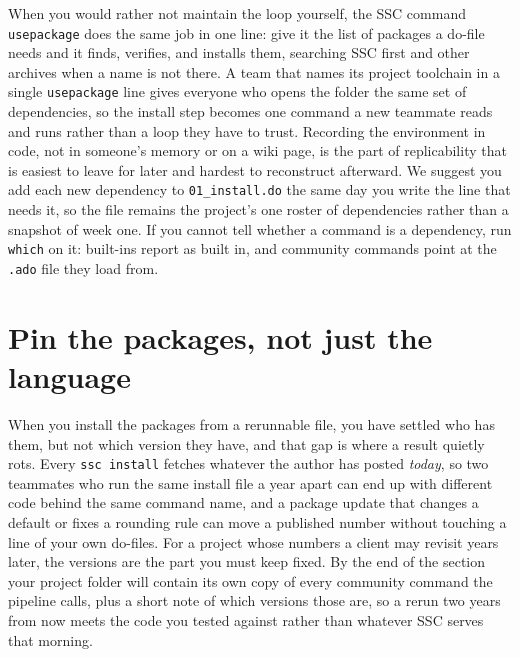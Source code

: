 When you would rather not maintain the loop yourself, the SSC command \texttt{usepackage} \parencite{booth2011usepackage} does the same job in one line: give it the list of packages a do-file needs and it finds, verifies, and installs them, searching SSC first and other archives when a name is not there. A team that names its project toolchain in a single \texttt{usepackage} line gives everyone who opens the folder the same set of dependencies, so the install step becomes one command a new teammate reads and runs rather than a loop they have to trust. Recording the environment in code, not in someone's memory or on a wiki page, is the part of replicability that is easiest to leave for later and hardest to reconstruct afterward. We suggest you add each new dependency to \texttt{01\_install.do} the same day you write the line that needs it, so the file remains the project's one roster of dependencies rather than a snapshot of week one. If you cannot tell whether a command is a dependency, run \texttt{which} on it: built-ins report as built in, and community commands point at the \texttt{.ado} file they load from.

\section{Pin the packages, not just the language}\label{sec:ch02-pinning}
When you install the packages from a rerunnable file, you have settled who has them, but not which version they have, and that gap is where a result quietly rots. Every \texttt{ssc install} fetches whatever the author has posted \emph{today}, so two teammates who run the same install file a year apart can end up with different code behind the same command name, and a package update that changes a default or fixes a rounding rule can move a published number without touching a line of your own do-files. For a project whose numbers a client may revisit years later, the versions are the part you must keep fixed. By the end of the section your project folder will contain its own copy of every community command the pipeline calls, plus a short note of which versions those are, so a rerun two years from now meets the code you tested against rather than whatever SSC serves that morning.

